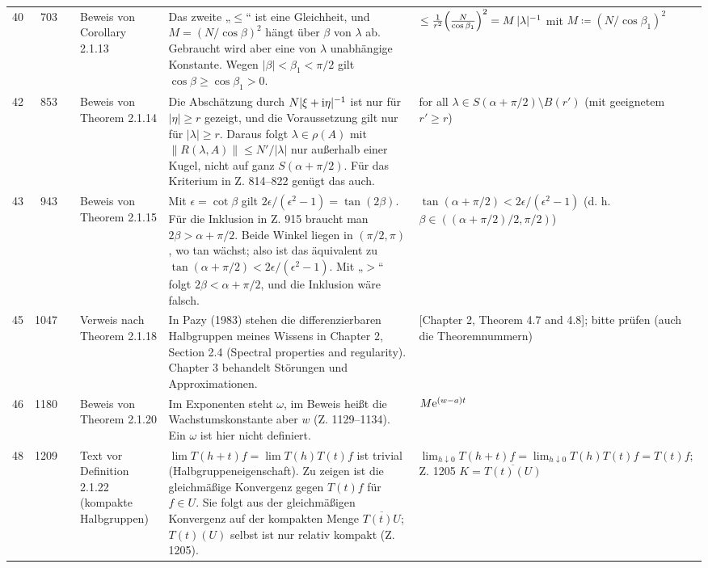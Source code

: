\documentclass[10pt]{article}
\begin{document}
\begin{longtable}{@{}rrc>{\RaggedRight\arraybackslash}p{3.0cm}>{\RaggedRight\arraybackslash}p{11.4cm}>{\RaggedRight\arraybackslash}p{7.4cm}@{}}
40 & 703 & \sichB{} & Beweis von Corollary 2.1.13 & Das zweite „$\ensuremath{\leq}$“ ist eine Gleichheit, und $M = (N/\cos\beta)^{2}$ hängt über $\ensuremath{\beta}$ von $\ensuremath{\lambda}$ ab. Gebraucht wird aber eine von $\ensuremath{\lambda}$ unabhängige Konstante. Wegen $\vert\beta\vert < \beta_{1} < \pi/2$ gilt $\cos\beta \geq \cos\beta_{1} > 0$. & $\leq \frac{1}{r^{2}}\mleft( \frac{N}{\cos\beta_{1}} \mright)^{2} = M\,\vert\lambda\vert^{-1}$ mit $M \coloneq (N/\cos\beta_{1})^{2}$ \\[2pt]
42 & 853 & \sichB{} & Beweis von Theorem 2.1.14 & Die Abschätzung durch $N\vert\xi+\mathrm{i}\eta\vert^{-1}$ ist nur für $\vert\eta\vert \geq r$ gezeigt, und die Voraussetzung gilt nur für $\vert\lambda\vert \geq r$. Daraus folgt $\lambda \in \rho(A)$ mit $\|R(\lambda,A)\| \leq N'/\vert\lambda\vert$ nur außerhalb einer Kugel, nicht auf ganz $S(\alpha+\pi/2)$. Für das Kriterium in Z. 814–822 genügt das auch. & {for all $\lambda \in S(\alpha+\pi/2) \setminus B(r')$} (mit geeignetem $r' \geq r$) \\[2pt]
43 & 943 & \sichA{} & Beweis von Theorem 2.1.15 & Mit $\epsilon = \cot\beta$ gilt $2\epsilon/(\epsilon^{2}-1) = \tan(2\beta)$. Für die Inklusion in Z. 915 braucht man $2\beta > \alpha+\pi/2$. Beide Winkel liegen in $(\pi/2,\pi)$, wo tan wächst; also ist das äquivalent zu $\tan(\alpha+\pi/2) < 2\epsilon/(\epsilon^{2}-1)$. Mit „$>$“ folgt $2\beta < \alpha+\pi/2$, und die Inklusion wäre falsch. & $\tan(\alpha + \pi/2) < 2\epsilon/(\epsilon^{2}-1)$ (d. h. $\beta \in ((\alpha+\pi/2)/2,\pi/2)$) \\[2pt]
45 & 1047 & \sichC{} & Verweis nach Theorem 2.1.18 & In Pazy (1983) stehen die differenzierbaren Halbgruppen meines Wissens in Chapter 2, Section 2.4 (Spectral properties and regularity). Chapter 3 behandelt Störungen und Approximationen. & {[Chapter 2, Theorem 4.7 and 4.8]}; bitte prüfen (auch die Theoremnummern) \\[2pt]
46 & 1180 & \sichB{} & Beweis von Theorem 2.1.20 & Im Exponenten steht $\omega$, im Beweis heißt die Wachstumskonstante aber $w$ (Z. 1129–1134). Ein $\ensuremath{\omega}$ ist hier nicht definiert. & $M\mathrm{e}^{(w - a)t}$ \\[2pt]
48 & 1209 & \sichB{} & Text vor Definition 2.1.22 (kompakte Halbgruppen) & $\lim T(h+t)f = \lim T(h)T(t)f$ ist trivial (Halbgruppeneigenschaft). Zu zeigen ist die gleichmäßige Konvergenz gegen $T(t)f$ für $f \in U$. Sie folgt aus der gleichmäßigen Konvergenz auf der kompakten Menge $\overline{T(t)U}$; $T(t)(U)$ selbst ist nur relativ kompakt (Z. 1205). & $\lim_{h\downarrow 0} T(h+t)f = \lim_{h\downarrow 0} T(h)T(t)f = T(t)f$; Z. 1205 $K = \overline{T(t)(U)}$ \\[2pt]

\end{longtable}
\end{document}
